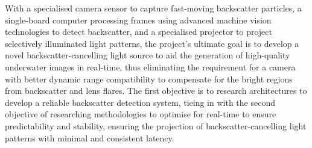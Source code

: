 With a specialised camera sensor to capture fast-moving backscatter particles, a single-board computer processing frames using advanced machine vision technologies to detect backscatter, and a specialised projector to project selectively illuminated light patterns, the project's ultimate goal is to develop a novel backscatter-cancelling light source to aid the generation of high-quality underwater images in real-time, thus eliminating the requirement for a camera with better dynamic range compatibility to compensate for the bright regions from backscatter and lens flares. The first objective is to research architectures to develop a reliable backscatter detection system, tieing in with the second objective of researching methodologies to optimise for real-time to ensure predictability and stability, ensuring the projection of backscatter-cancelling light patterns with minimal and consistent latency.
